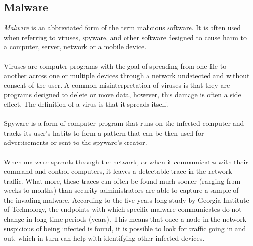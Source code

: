\documentclass[11pt]{article}
\begin{document}
    \subsection{Malware}
      {\it Malware} is an abbreviated form of the term malicious software. It is often used when referring to viruses, spyware, and other software designed to cause harm to a computer, server, network or a mobile device. \citep{malware}
      \\~\\
      Viruses are computer programs with the goal of spreading from one file to another across one or multiple devices through a network undetected and without consent of the user. A common misinterpretation of viruses is that they are programs designed to delete or move data, however, this damage is often a side effect. The definition of a virus is that it spreads itself. \citep{malware}
      \\~\\
      Spyware is a form of computer program that runs on the infected computer and tracks its user's habits to form a pattern that can be then used for advertisements or sent to the spyware's creator. \citep{malware}
      \\~\\
      When malware spreads through the network, or when it communicates with their command and control computers, it leaves a detectable trace in the network traffic. What more, these traces can often be found much sooner (ranging from weeks to months) than security administrators are able to capture a sample of the invading malware. \citep{network} According to the five years long study by Georgia Institute of Technology, the endpoints with which specific malware communicates do not change in long time periods (years). This means that once a node in the network suspicious of being infected is found, it is possible to look for traffic going in and out, which in turn can help with identifying other infected devices. \citep{network}
      \newpage
\end{document}
